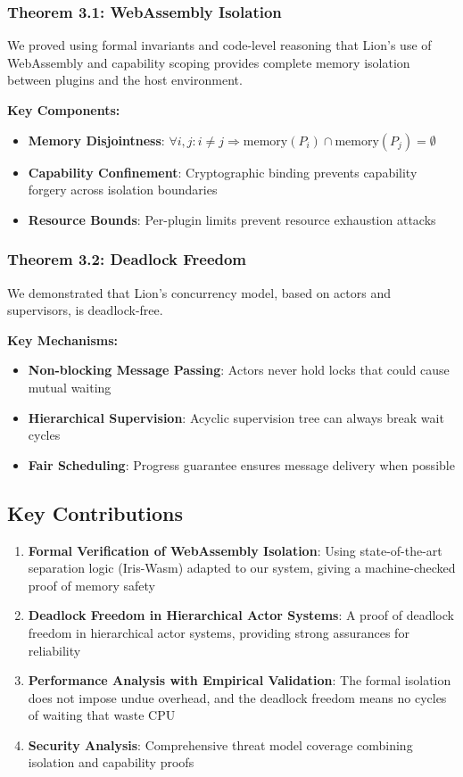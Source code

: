 \subsubsection{Theorem 3.1: WebAssembly Isolation}

We proved using formal invariants and code-level reasoning that Lion's use of WebAssembly and capability scoping provides complete memory isolation between plugins and the host environment.

\textbf{Key Components:}
\begin{itemize}
\item \textbf{Memory Disjointness}: $\forall i, j: i \neq j \Rightarrow \text{memory}(P_i) \cap \text{memory}(P_j) = \emptyset$
\item \textbf{Capability Confinement}: Cryptographic binding prevents capability forgery across isolation boundaries
\item \textbf{Resource Bounds}: Per-plugin limits prevent resource exhaustion attacks
\end{itemize}

\subsubsection{Theorem 3.2: Deadlock Freedom}

We demonstrated that Lion's concurrency model, based on actors and supervisors, is deadlock-free.

\textbf{Key Mechanisms:}
\begin{itemize}
\item \textbf{Non-blocking Message Passing}: Actors never hold locks that could cause mutual waiting
\item \textbf{Hierarchical Supervision}: Acyclic supervision tree can always break wait cycles
\item \textbf{Fair Scheduling}: Progress guarantee ensures message delivery when possible
\end{itemize}

\subsection{Key Contributions}

\begin{enumerate}
\item \textbf{Formal Verification of WebAssembly Isolation}: Using state-of-the-art separation logic (Iris-Wasm) adapted to our system, giving a machine-checked proof of memory safety
\item \textbf{Deadlock Freedom in Hierarchical Actor Systems}: A proof of deadlock freedom in hierarchical actor systems, providing strong assurances for reliability
\item \textbf{Performance Analysis with Empirical Validation}: The formal isolation does not impose undue overhead, and the deadlock freedom means no cycles of waiting that waste CPU
\item \textbf{Security Analysis}: Comprehensive threat model coverage combining isolation and capability proofs
\end{enumerate}


